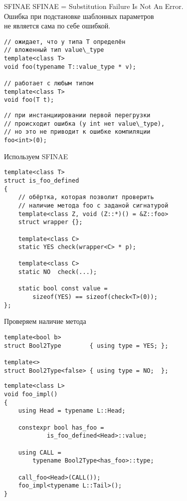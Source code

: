 \documentclass[aspectration=1610,t]{beamer}
\begin{document}
\begin{frame}[fragile]{SFINAE}
 SFINAE = Substitution Failure Is Not An Error.\\
 Ошибка при подстановке шаблонных параметров \\
 не является сама по себе ошибкой.
\begin{lstlisting}
// ожидает, что у типа T определён 
// вложенный тип value\_type
template<class T>
void foo(typename T::value_type * v);

// работает с любым типом
template<class T>
void foo(T t);
\end{lstlisting}
\begin{lstlisting}
// при инстанциировании первой перегрузки
// происходит ошибка (у int нет value\_type), 
// но это не приводит к ошибке компиляции
foo<int>(0);
\end{lstlisting}
\end{frame}

\begin{frame}[fragile]{Используем SFINAE}
\begin{lstlisting}
template<class T>
struct is_foo_defined
{
    // обёртка, которая позволит проверить
    // наличие метода foo с заданой сигнатурой
    template<class Z, void (Z::*)() = &Z::foo>
    struct wrapper {};

    template<class C>
    static YES check(wrapper<C> * p);

    template<class C>
    static NO  check(...);

    static bool const value = 
        sizeof(YES) == sizeof(check<T>(0));
};
\end{lstlisting}
\end{frame}

\begin{frame}[fragile]{Проверяем наличие метода}
\begin{lstlisting}
template<bool b> 
struct Bool2Type        { using type = YES; };

template<> 
struct Bool2Type<false> { using type = NO;  };
\end{lstlisting}

\begin{lstlisting}
template<class L> 
void foo_impl() 
{
    using Head = typename L::Head;
    
    constexpr bool has_foo = 
            is_foo_defined<Head>::value;
    
    using CALL = 
        typename Bool2Type<has_foo>::type;
    
    call_foo<Head>(CALL());
    foo_impl<typename L::Tail>();
}
\end{lstlisting}
\end{frame}
\end{document}
